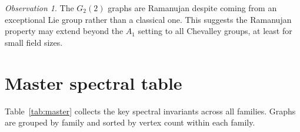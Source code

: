 \documentclass[11pt,a4paper]{article}
\theoremstyle{plain}
\theoremstyle{definition}
\theoremstyle{remark}
\newtheorem{observation}[theorem]{Observation}
\begin{document}
\begin{observation}
The $G_2(2)$ graphs are Ramanujan despite coming from an exceptional Lie
group rather than a classical one. This suggests the Ramanujan property
may extend beyond the $A_1$ setting to all Chevalley groups, at least for
small field sizes.
\end{observation}


\section{Master spectral table}

Table~\ref{tab:master} collects the key spectral invariants across all
families. Graphs are grouped by family and sorted by vertex count within
each family.
\end{document}
